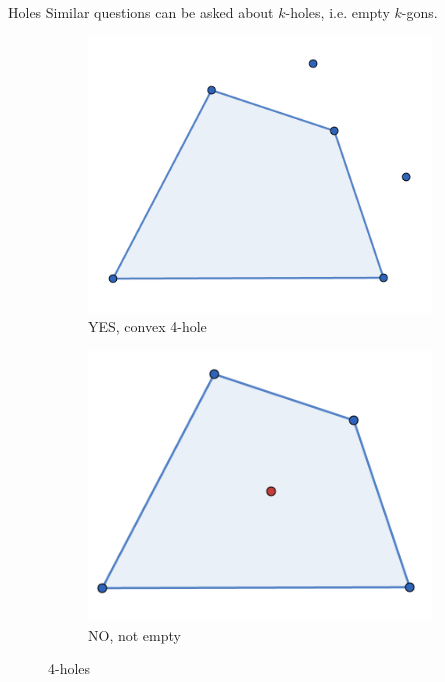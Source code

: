 \documentclass{beamer}
\begin{document}
\begin{frame}{Holes}
	Similar questions can be asked about $k$-holes, i.e. empty $k$-gons.

	\begin{figure}
		\centering
		\begin{subfigure}[t]{0.45\textwidth}
			\includegraphics[width=\textwidth]{4hole.png}
			\caption{YES, convex 4-hole}
			\label{fig4hole}
		\end{subfigure}
		\begin{subfigure}[t]{0.45\textwidth}
			\includegraphics[width=\textwidth]{not_4hole.png}
			\caption{NO, not empty}
			\label{fignot4hole}
		\end{subfigure}
		\caption{4-holes}
		\label{fighole}
	\end{figure}

\end{frame}
\end{document}
